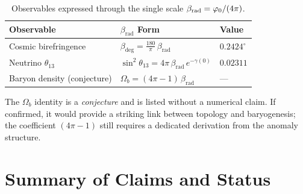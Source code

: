 \begin{table}[H]
\centering
\begin{tabular}{@{}lll@{}}
\toprule
\textbf{Observable} & \textbf{$\beta_{\text{rad}}$ Form} & \textbf{Value}\\
\midrule
Cosmic birefringence & $\beta_{\text{deg}} = \frac{180}{\pi}\,\beta_{\text{rad}}$ & $0.2424^\circ$\\
Neutrino $\theta_{13}$ & $\sin^2\theta_{13} = 4\pi\,\beta_{\text{rad}}\,e^{-\gamma(0)}$ & $0.02311$\\
Baryon density (conjecture) & $\Omega_b = (4\pi - 1)\,\beta_{\text{rad}}$ & ---\\
\bottomrule
\end{tabular}
\caption{Observables expressed through the single scale $\beta_{\text{rad}} = \varphi_0/(4\pi)$.}
\label{tab:beta}
\end{table}

\begin{remark}
The $\Omega_b$ identity is a \emph{conjecture} and is listed without a numerical claim.
If confirmed, it would provide a striking link between topology and baryogenesis; the
coefficient $(4\pi - 1)$ still requires a dedicated derivation from the anomaly structure.
\end{remark}

\section{Summary of Claims and Status}

